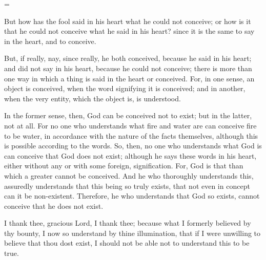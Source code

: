 \hangindent=\parindent
{}

\vspace{1\baselineskip}

But how has the fool said in his heart what he could not conceive; or
how is it that he could not conceive what he said in his heart? since
it is the same to say in the heart, and to conceive.

But, if really, nay, since really, he both conceived, because he said
in his heart; and did not say in his heart, because he could not
conceive; there is more than one way in which a thing is said in the
heart or conceived. For, in one sense, an object is conceived,
 when the word signifying it is conceived; and in another,
when the very entity, which the object is, is understood.

In the former sense, then, God can be conceived not to exist; but in
the latter, not at all. For no one who understands what fire and water
are can conceive fire to be water, in accordance with the nature of
the facts themselves, although this is possible according to the
words. So, then, no one who understands what God is can conceive that
God does not exist; although he says these words in his heart, either
without any or with some foreign, signification. For, God is that than
which a greater cannot be conceived. And he who thoroughly understands
this, assuredly understands that this being so truly exists, that not
even in concept can it be non-existent. Therefore, he who understands
that God so exists, cannot conceive that he does not exist.

I thank thee, gracious Lord, I thank thee; because what I formerly
believed by thy bounty, I now so understand by thine illumination,
that if I were unwilling to believe that thou dost exist, I should not
be able not to understand this to be true.

